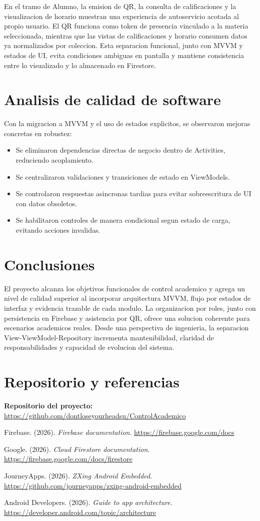 \documentclass[12pt,a4paper]{article}
\begin{document}
En el tramo de Alumno, la emision de QR, la consulta de calificaciones y la visualizacion de horario muestran una experiencia de autoservicio acotada al propio usuario. El QR funciona como token de presencia vinculado a la materia seleccionada, mientras que las vistas de calificaciones y horario consumen datos ya normalizados por coleccion. Esta separacion funcional, junto con MVVM y estados de UI, evita condiciones ambiguas en pantalla y mantiene consistencia entre lo visualizado y lo almacenado en Firestore.

\section{Analisis de calidad de software}
Con la migracion a MVVM y el uso de estados explicitos, se observaron mejoras concretas en robustez:

\begin{itemize}[leftmargin=*]
    \item Se eliminaron dependencias directas de negocio dentro de Activities, reduciendo acoplamiento.
    \item Se centralizaron validaciones y transiciones de estado en ViewModels.
    \item Se controlaron respuestas asincronas tardias para evitar sobreescritura de UI con datos obsoletos.
    \item Se habilitaron controles de manera condicional segun estado de carga, evitando acciones invalidas.
\end{itemize}

\section{Conclusiones}
El proyecto alcanza los objetivos funcionales de control academico y agrega un nivel de calidad superior al incorporar arquitectura MVVM, flujo por estados de interfaz y evidencia trazable de cada modulo. La organizacion por roles, junto con persistencia en Firebase y asistencia por QR, ofrece una solucion coherente para escenarios academicos reales. Desde una perspectiva de ingenieria, la separacion View-ViewModel-Repository incrementa mantenibilidad, claridad de responsabilidades y capacidad de evolucion del sistema.

\section{Repositorio y referencias}
\textbf{Repositorio del proyecto:} \url{https://github.com/dontloseyourheadsu/ControlAcademico}

Firebase. (2026). \textit{Firebase documentation}. \url{https://firebase.google.com/docs}

Google. (2026). \textit{Cloud Firestore documentation}. \url{https://firebase.google.com/docs/firestore}

JourneyApps. (2026). \textit{ZXing Android Embedded}. \url{https://github.com/journeyapps/zxing-android-embedded}

Android Developers. (2026). \textit{Guide to app architecture}. \url{https://developer.android.com/topic/architecture}
\end{document}
